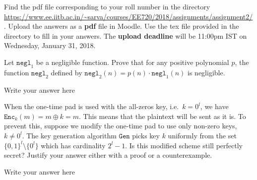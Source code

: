 \documentclass[12pt,a4paper,answers]{exam}
\begin{document}
\pagestyle{head}
\headrule
{}
%

\extraheadheight{.4in}%
\extrafootheight{-0.5in}%
\extrawidth{0.5in}%

Find the pdf file corresponding to your roll number in the directory \url{https://www.ee.iitb.ac.in/~sarva/courses/EE720/2018/assignments/assignment2/}. Upload the answers as a \textbf{pdf} file in Moodle. Use the tex file provided in the directory to fill in your answers. The \textbf{upload deadline} will be 11:00pm IST on Wednesday, January 31, 2018.
\begin{questions}
\question[5] Let $\texttt{negl}_1$ be a negligible function. Prove that for any positive polynomial $p$, the function $\texttt{negl}_2$ defined by $\texttt{negl}_2(n) = p(n) \cdot \texttt{negl}_1(n)$ is negligible.
  \begin{solution}
    Write your answer here
  \end{solution}
 
\question[5] When the one-time pad is used with the all-zeros key, i.e.~$k = 0^l$, we have $\texttt{Enc}_k(m) = m \oplus k = m$. This means that the plaintext will be sent as it is. To prevent this, suppose we modify the one-time pad to use only non-zero keys, $k \neq 0^l$. The key generation algorithm $\texttt{Gen}$ picks key $k$ uniformly from the set $\{0,1\}^l \setminus \{0^l\}$ which has cardinality $2^l - 1$. Is this modified scheme still perfectly secret? Justify your answer either with a proof or a counterexample.
  \begin{solution}
    Write your answer here
  \end{solution}

  
\end{questions}
\end{document}
